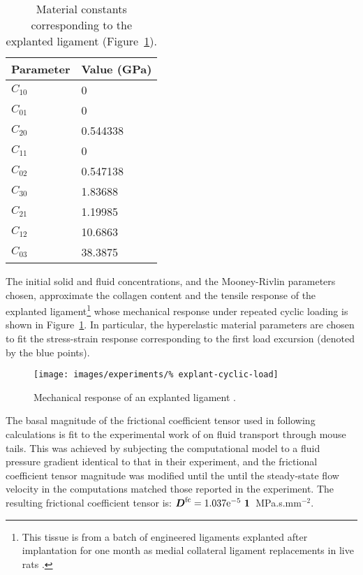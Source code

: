 \begin{table}[!hptb]
\centering
\begin{tabular}{|l|l|}
\hline Parameter & Value (GPa) \\
\hline \hline
$C_{10}$  &   0  \\
$C_{01}$  &   0  \\
$C_{20}$  &   0.544338  \\
$C_{11}$  &   0  \\
$C_{02}$  &   0.547138  \\
$C_{30}$  &   1.83688  \\
$C_{21}$  &   1.19985  \\
$C_{12}$  &   10.6863  \\
$C_{03}$  &   38.3875  \\
\hline
\end{tabular}
\caption{Material constants corresponding to the explanted
  ligament (Figure~\ref{explanted-ligament}).}
\label{parameters-explant}
\end{table}

The initial solid and fluid concentrations, and the Mooney-Rivlin
parameters chosen, approximate the collagen content and the tensile response
 of the explanted ligament\footnote{This tissue is from a
  batch of engineered ligaments explanted after implantation for one
  month as medial collateral ligament replacements in live rats
  \citep{Calvethesis:06}.} whose mechanical response under repeated
cyclic loading is shown in Figure~\ref{explanted-ligament}. In
particular, the hyperelastic material parameters are chosen to fit the
stress-strain response corresponding to the first load excursion
(denoted by the blue points).

\begin{figure}[!hptb]
  \centering
  \texttt{[image: images/experiments/\%
    explant-cyclic-load]}
  \caption{Mechanical response of an explanted ligament
    \citep{Calvethesis:06}.}
  \label{explanted-ligament}
\end{figure}

The basal magnitude of the frictional coefficient tensor used in
following calculations is fit to the experimental work of
\citet{Swartzetal:99} on fluid transport through mouse tails. This was
achieved by subjecting the computational model to a fluid pressure
gradient identical to that in their experiment, and the frictional
coefficient tensor magnitude was modified until the until the
steady-state flow velocity in the computations matched those reported
in the experiment. The resulting frictional coefficient tensor is:
$\bD^{\mathrm{fc}} = 1.037 \mathrm{e}^{-5} \ \bone$~MPa.s.mm$^{-2}$.

